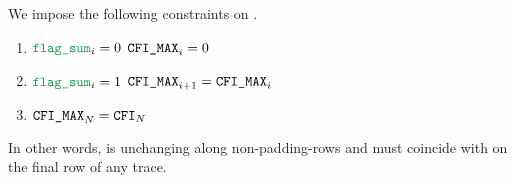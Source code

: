 We impose the following constraints on \romColumnCfiMax{}.
\begin{enumerate}
    \item \If $\flagSum _{i} = 0$ \Then $\texttt{CFI\_MAX} _{i}     = 0$
    \item \If $\flagSum _{i} = 1$ \Then $\texttt{CFI\_MAX} _{i + 1} = \texttt{CFI\_MAX} _{i}$
    \item $\texttt{CFI\_MAX} _{N} = \texttt{CFI} _{N}$
\end{enumerate}
\saNote{}
In other words, \romColumnCfiMax{} is unchanging along non-padding-rows
and must coincide with \romColumnCfi{} on the final row of any trace.
